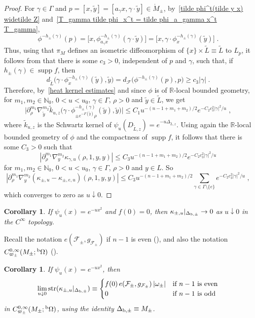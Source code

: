 \documentclass{memo-l}
\theoremstyle{plain}
\newtheorem{cor}[thm]{Corollary}
\theoremstyle{definition}
\theoremstyle{remark}
\newcommand{\N}{\mathbb{N}}
\newcommand{\R}{\mathbb{R}}
\newcommand{\FF}{\mathcal{F}}
\newcommand{\supp}{\operatorname{supp}}
\newcommand{\str}{\operatorname{str}}
\newcommand{\bOmega}{{}^{\text{\rm b}}\Omega}
\numberwithin{section}{chapter}
\numberwithin{equation}{section}%
\begin{document}
\begin{proof}
For $\gamma\in\Gamma$ and $p=[x,\tilde y]=[a_\gamma x,\gamma\cdot\tilde y]\in\mathring M_\pm$, by~\eqref{tilde phi^t(tilde y x) widetilde Z} and~\eqref{T_gamma tilde phi_x^t = tilde phi_a_gamma x^t T_gamma},
\[
\phi^{-h_\pm(\gamma)}(p)=\big[x,\phi^{-h_\pm(\gamma)}_{a_\gamma x}(\gamma\cdot\tilde y)\big]
=\big[x,\gamma\cdot\phi^{-h_\pm(\gamma)}_x(\tilde y)\big]\;.
\]
Thus, using that $\pi_M$ defines an isometric diffeomorphism of $\{x\}\times\widetilde L\equiv\widetilde L$ to $L_p$, it follows from  that there is some $c_3>0$, independent of $p$ and $\gamma$, such that, if $h_\pm(\gamma)\in\supp f$, then
\[
d_{\widetilde L}\big(\gamma\cdot\phi^{-h_\pm(\gamma)}_x(\tilde y),\tilde y\big)=d_{\FF}\big(\phi^{-h_\pm(\gamma)}(p),p\big)\ge c_3|\gamma|\;.
\]
Therefore, by~\eqref{heat kernel estimates} and since $\phi$ is of $\R$-local bounded geometry, for $m_1,m_2\in\N_0$, $0<u<u_0$, $\gamma\in\Gamma$, $\rho>0$ and $\tilde y\in\widetilde L$, we get
\[
\big|\partial_\rho^{m_1}\nabla_{\tilde y}^{m_2}\tilde k_{u,z}\big(\gamma\cdot\phi^{-h_\pm(\gamma)}_{\pm e^{-F(\tilde y)}\rho}(\tilde y),\tilde y\big)\big|
\le C_1u^{-(n-1+m_1+m_2)/2}e^{-C_2c_3^2|\gamma|^2/u}\;,
\]
where $\tilde k_{u,z}$ is the Schwartz kernel of $\psi_u(D_{\widetilde L,z})=e^{-u\Delta_{\widetilde L,z}}$. Using again the $\R$-local bounded geometry of $\phi$ and the compactness of $\supp f$, it follows that there is some $C_3>0$ such that
\[
|\partial_\rho^{m_1}\nabla_y^{m_2}\kappa_{\gamma,u}(\rho,1,y,y)|\le C_3u^{-(n-1+m_1+m_2)/2}e^{-C_2c_3^2|\gamma|^2/u}
\]
for $m_1,m_2\in\N_0$, $0<u<u_0$, $\gamma\in\Gamma$, $\rho>0$ and $y\in L$. So
\[
|\partial_\rho^{m_1}\nabla_y^{m_2}(\kappa_{\pm,u}-\kappa_{\pm,e,u})(\rho,1,y,y)|
\le C_3u^{-(n-1+m_1+m_2)/2}\sum_{\gamma\in\Gamma\setminus\{e\}} e^{-C_2c_3^2|\gamma|^2/u}\;,
\]
which converges to zero as $u\downarrow0$.
\end{proof}

\begin{cor}\label{c: kappa_pm u|_Deltab to 0}
If $\psi_u(x)=e^{-ux^2}$ and $f(0)=0$, then $\kappa_{\pm,u}|_{\Delta_{\text{\rm b},\pm}}\to0$ as $u\downarrow0$ in the $C^\infty$ topology. 
\end{cor}

Recall the notation $e(\FF_\pm,g_{\FF_\pm})$ if $n-1$ is even (), and also the notation $C^{0,\infty}_{\varpi_\pm}(M_\pm;\bOmega)$ ().

\begin{cor}\label{c: lim_u to 0 trs(kappa_pm u|_Delta_b pm) equiv f(0) Pf(R_FF_pm) |omega_pm|}
If $\psi_u(x)=e^{-ux^2}$, then
\[
\lim_{u\downarrow0}\str(\kappa_{\pm,u}|_{\Delta_{\text{\rm b},\pm}})\equiv
\begin{cases}
f(0)\,e(\FF_\pm,g_{\FF_\pm})\,|\omega_\pm| & \text{if $n-1$ is even}\\
0 & \text{if $n-1$ is odd}
\end{cases}
\]
in $C^{0,\infty}_{\varpi_\pm}(M_\pm;\bOmega)$, using the identity $\Delta_{\text{\rm b},\pm}\equiv M_\pm$.
\end{cor}
\end{document}
